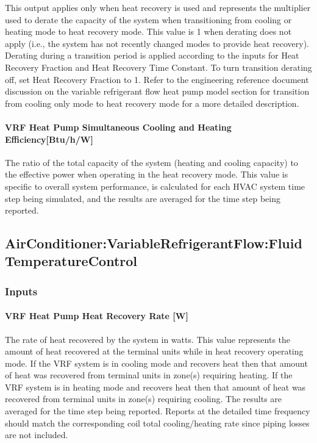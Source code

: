 This output applies only when heat recovery is used and represents the multiplier used to derate the capacity of the system when transitioning from cooling or heating mode to heat recovery mode. This value is 1 when derating does not apply (i.e., the system has not recently changed modes to provide heat recovery). Derating during a transition period is applied according to the inputs for Heat Recovery Fraction and Heat Recovery Time Constant. To turn transition derating off, set Heat Recovery Fraction to 1. Refer to the engineering reference document discussion on the variable refrigerant flow heat pump model section for transition from cooling only mode to heat recovery mode for a more detailed description.

\paragraph{\texorpdfstring{VRF Heat Pump Simultaneous Cooling and Heating Efficiency{[}Btu/h/W{]}}{VRF Heat Pump Simultaneous Cooling and Heating Efficiency}}\label{vrf-heat-pump-simultaneous-cooling-and-heating-efficiency}

The ratio of the total capacity of the system (heating and cooling capacity) to the effective power when operating in the heat recovery mode. This value is specific to overall system performance, is calculated for each HVAC system time step being simulated, and the results are averaged for the time step being reported.

\subsection{AirConditioner:VariableRefrigerantFlow:FluidTemperatureControl}\label{airconditionervariablerefrigerantflowfluidtemperaturecontrol}
\subsubsection{Inputs}\label{inputs-1-048}

\paragraph{\texorpdfstring{VRF Heat Pump Heat Recovery Rate {[}W{]}}{VRF Heat Pump Heat Recovery Rate}}\label{vrf-heat-pump-heat-recovery-rate}

The rate of heat recovered by the system in watts. This value represents the amount of heat recovered at the terminal units while in heat recovery operating mode. If the VRF system is in cooling mode and recovers heat then that amount of heat was recovered from terminal units in zone(s) requiring heating. If the VRF system is in heating mode and recovers heat then that amount of heat was recovered from terminal units in zone(s) requiring cooling. The results are averaged for the time step being reported. Reports at the detailed time frequency should match the corresponding coil total cooling/heating rate since piping losses are not included.

